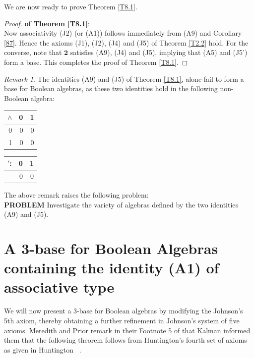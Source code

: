 \documentclass{amsart}
\theoremstyle{plain}
\theoremstyle{problem}
\theoremstyle{definition}
\theoremstyle{remark}
\newtheorem{remark}[theorem]{Remark}
\numberwithin{equation}{section}
\begin{document}
We are now ready to prove Theorem \ref{T8.1}.\\  

\begin{proof}{\bf of Theorem \ref{T8.1}}:  \\      
    Now associativity (J2) (or (A1)) follows immediately from (A9) and Corollary \ref{87}.  Hence the axioms (J1), (J2), (J4) and (J5) of Theorem \ref{T2.2} hold. For the converse, note that $\mathbf{2}$ satisfies (A9), (J4) and (J5),
 implying that (A5) and (J5') form a base.  This completes the proof of Theorem \ref{T8.1}.
 \end{proof}

\begin{remark} 
  The identities (A9) and (J5) of Theorem \ref{T8.1}, alone fail to form a base for Boolean algebras, as these two identities hold in the following non-Boolean algebra: \\

\begin{tabular}{r|rr}
$\land$ & 0 & 1\\
\hline
    0 & 0 & 0 \\
    1 & 0 & 0
\end{tabular} \hspace{.5cm}
 \begin{tabular}{r|rr}
$'$:& 0 & 1\\
\hline
   & 0 & 0
\end{tabular} 
\end{remark}


The above remark raises the following problem:\\

{\bf PROBLEM} Investigate the variety of algebras defined by the two identities 
(A9) and (J5).\\


\medskip

\section{A 3-base for Boolean Algebras containing the identity (A1) of associative type}

    We will now present a 3-base for Boolean algebras by modifying the Johnson's 5th axiom, thereby obtaining a further refinement in Johnson's system of five axioms.  Meredith and Prior
remark in their Footnote 5 of \cite{cM68} that Kalman informed them that the following theorem follows from Huntington's fourth set of axioms as given in Huntington ~\cite{eH33i}.   
  
\end{document}
